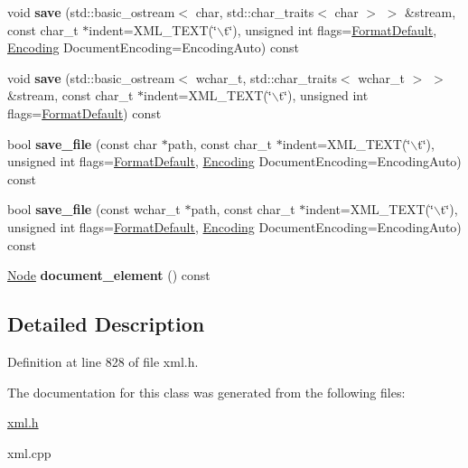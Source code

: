 \begin{DoxyCompactItemize}
\item 
\hypertarget{classphys_1_1xml_1_1Document_a7b59dab683101ad4374b8b9009dbec4a}{
void {\bfseries save} (std::basic\_\-ostream$<$ char, std::char\_\-traits$<$ char $>$ $>$ \&stream, const char\_\-t $\ast$indent=XML\_\-TEXT(\char`\"{}$\backslash$t\char`\"{}), unsigned int flags=\hyperlink{namespacephys_1_1xml_a08bf6aab51f79929d9097706a5e64408}{FormatDefault}, \hyperlink{namespacephys_1_1xml_a420f5de782438f88160321385bea2015}{Encoding} DocumentEncoding=EncodingAuto) const }
\label{dd/d44/classphys_1_1xml_1_1Document_a7b59dab683101ad4374b8b9009dbec4a}

\item 
\hypertarget{classphys_1_1xml_1_1Document_ab0b68aaf634ec540815f6ea99da15d58}{
void {\bfseries save} (std::basic\_\-ostream$<$ wchar\_\-t, std::char\_\-traits$<$ wchar\_\-t $>$ $>$ \&stream, const char\_\-t $\ast$indent=XML\_\-TEXT(\char`\"{}$\backslash$t\char`\"{}), unsigned int flags=\hyperlink{namespacephys_1_1xml_a08bf6aab51f79929d9097706a5e64408}{FormatDefault}) const }
\label{dd/d44/classphys_1_1xml_1_1Document_ab0b68aaf634ec540815f6ea99da15d58}

\item 
\hypertarget{classphys_1_1xml_1_1Document_a733a41e829fb573c649b214125b33445}{
bool {\bfseries save\_\-file} (const char $\ast$path, const char\_\-t $\ast$indent=XML\_\-TEXT(\char`\"{}$\backslash$t\char`\"{}), unsigned int flags=\hyperlink{namespacephys_1_1xml_a08bf6aab51f79929d9097706a5e64408}{FormatDefault}, \hyperlink{namespacephys_1_1xml_a420f5de782438f88160321385bea2015}{Encoding} DocumentEncoding=EncodingAuto) const }
\label{dd/d44/classphys_1_1xml_1_1Document_a733a41e829fb573c649b214125b33445}

\item 
\hypertarget{classphys_1_1xml_1_1Document_a7eff3072bf3e87b40b1d6906eb5baf17}{
bool {\bfseries save\_\-file} (const wchar\_\-t $\ast$path, const char\_\-t $\ast$indent=XML\_\-TEXT(\char`\"{}$\backslash$t\char`\"{}), unsigned int flags=\hyperlink{namespacephys_1_1xml_a08bf6aab51f79929d9097706a5e64408}{FormatDefault}, \hyperlink{namespacephys_1_1xml_a420f5de782438f88160321385bea2015}{Encoding} DocumentEncoding=EncodingAuto) const }
\label{dd/d44/classphys_1_1xml_1_1Document_a7eff3072bf3e87b40b1d6906eb5baf17}

\item 
\hypertarget{classphys_1_1xml_1_1Document_a481cbf277cfe6d6daf1b66f8d862b88e}{
\hyperlink{classphys_1_1xml_1_1Node}{Node} {\bfseries document\_\-element} () const }
\label{dd/d44/classphys_1_1xml_1_1Document_a481cbf277cfe6d6daf1b66f8d862b88e}

\end{DoxyCompactItemize}


\subsection{Detailed Description}


Definition at line 828 of file xml.h.



The documentation for this class was generated from the following files:\begin{DoxyCompactItemize}
\item 
\hyperlink{xml_8h}{xml.h}\item 
xml.cpp\end{DoxyCompactItemize}
